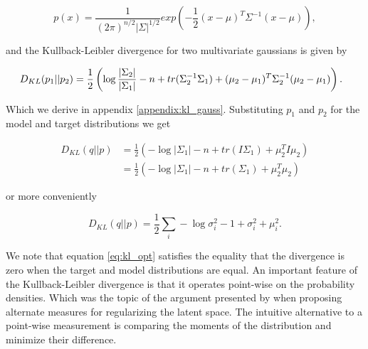 \begin{equation}
p(x) = \frac{1}{(2\pi)^{n/2}|\Sigma|^{1/2}}exp(-\frac{1}{2}(x- \mu)^T\Sigma^{-1}(x-\mu)),
\end{equation}

\noindent and the Kullback-Leibler divergence for two multivariate gaussians is given by 


\begin{equation}
\hspace*{-0.1in}
D_{KL}(p_1|| p_2 ) = \frac{1}{2} \left( \log \frac{|\Sigma_2|}{|\Sigma_1|} -n + tr(\Sigma^{-1}_2 \Sigma_1) + (\mu_2 - \mu_1)^T\Sigma_2^{-1}(\mu_2 - \mu_1) \right).
\end{equation}

\noindent Which we derive in appendix \ref{appendix:kl_gauss}. Substituting $p_1$ and $p_2$ for the model and target distributions we get 

\begin{align*}
D_{KL}(q||p) &= \frac{1}{2} \left( - \log {|\Sigma_1|} -n + tr(I \Sigma_1) + \mu_2 ^TI\mu_2 \right) \\
&= \frac{1}{2} \left( - \log {|\Sigma_1|} -n + tr(\Sigma_1) + \mu_2 ^T\mu_2 \right)
\end{align*}

\noindent or more conveniently

\begin{equation}\label{eq:kl_opt}
D_{KL}(q||p) = \frac{1}{2} \sum_i -\log \sigma_i^2 - 1 + \sigma^2_i + \mu_i^2 .
\end{equation}


\noindent We note that equation \ref{eq:kl_opt} satisfies the equality that the divergence is zero when the target and model distributions are equal. An important feature of the Kullback-Leibler divergence is that it operates point-wise on the probability densities. Which was the topic of the argument presented by \citet{Zhao} when proposing alternate measures for regularizing the latent space. The intuitive alternative to a point-wise measurement is comparing the moments of the distribution and minimize their difference. 